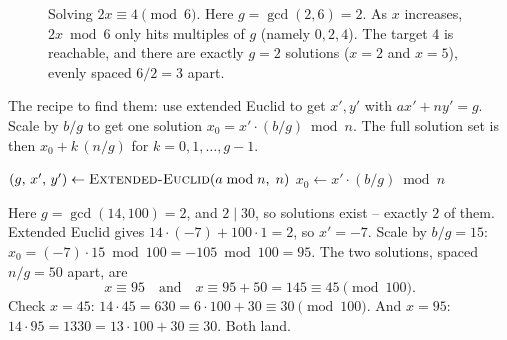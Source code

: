 \begin{figure}[H]
\centering
{}
\caption{Solving $2x \equiv 4 \pmod 6$. Here $g = \gcd(2,6) = 2$. As $x$ increases, $2x \bmod 6$ only hits multiples of $g$ (namely $0, 2, 4$). The target $4$ is reachable, and there are exactly $g=2$ solutions ($x=2$ and $x=5$), evenly spaced $6/2 = 3$ apart.}
\label{ch30:fig-linear}
\end{figure}

The recipe to find them: use extended Euclid to get $x', y'$ with $ax' + ny' =
g$. Scale by $b/g$ to get one solution $x_0 = x' \cdot (b/g) \bmod n$. The full
solution set is then $x_0 + k\,(n/g)$ for $k = 0,1,\dots,g-1$.

\begin{algorithm}[H]
\caption{\textsc{Modular-Linear-Solver}$(a,b,n)$}
\label{ch30:alg-linear}
$(g,\, x',\, y') \leftarrow \textsc{Extended-Euclid}(a \bmod n,\; n)$\;
$x_0 \leftarrow x' \cdot (b / g) \bmod n$\;
\end{algorithm}

\begin{example}
\label{ch30:ex-linear}
Here $g = \gcd(14,100) = 2$, and $2 \mid 30$, so solutions exist -- exactly $2$
of them. Extended Euclid gives $14 \cdot (-7) + 100 \cdot 1 = 2$, so $x' = -7$.
Scale by $b/g = 15$: $x_0 = (-7)\cdot 15 \bmod 100 = -105 \bmod 100 = 95$. The
two solutions, spaced $n/g = 50$ apart, are
\[
  x \equiv 95 \quad\text{and}\quad x \equiv 95 + 50 = 145 \equiv 45 \pmod{100}.
\]
Check $x = 45$: $14 \cdot 45 = 630 = 6\cdot 100 + 30 \equiv 30 \pmod{100}$.
And $x = 95$: $14 \cdot 95 = 1330 = 13\cdot 100 + 30 \equiv 30$. Both land.
\end{example}

